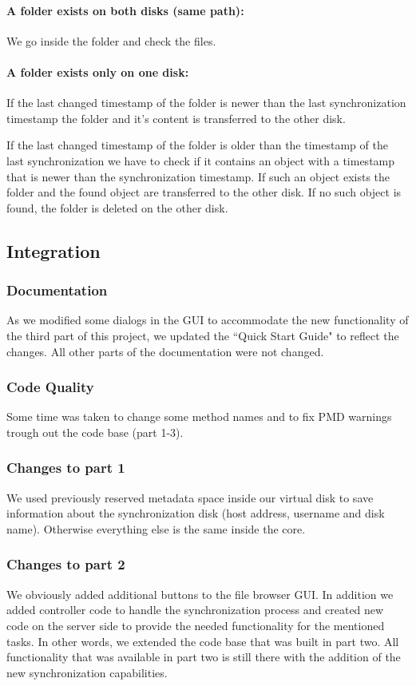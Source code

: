 \documentclass[a4paper,12pt]{article}
\begin{document}
\paragraph{A folder exists on both disks (same path):} We go inside the folder and check the files.

\paragraph{A folder exists only on one disk:} If the last changed timestamp of the folder is newer than the last synchronization timestamp the folder and it's content is transferred to the other disk.

If the last changed timestamp of the folder is older than the timestamp of the last synchronization we have to check if it contains an object with a timestamp that is newer than the synchronization timestamp. If such an object exists the folder and the found object are transferred to the other disk. If no such object is found, the folder is deleted on the other disk.

\subsection{Integration}
\subsubsection{Documentation}
As we modified some dialogs in the GUI to accommodate the new functionality of the third part of this project, we updated the ``Quick Start Guide" to reflect the changes. All other parts of the documentation were not changed.

\subsubsection{Code Quality}
Some time was taken to change some method names and to fix PMD warnings trough out the code base (part 1-3).

\subsubsection{Changes to part 1}
We used previously reserved metadata space inside our virtual disk to save information about the synchronization disk (host address, username and disk name). Otherwise everything else is the same inside the core.

\subsubsection{Changes to part 2}
We obviously added additional buttons to the file browser GUI. In addition we added controller code to handle the synchronization process and created new code on the server side to provide the needed functionality for the mentioned tasks. In other words, we extended the code base that was built in part two. All functionality that was available in part two is still there with the addition of the new synchronization capabilities.
\end{document}
